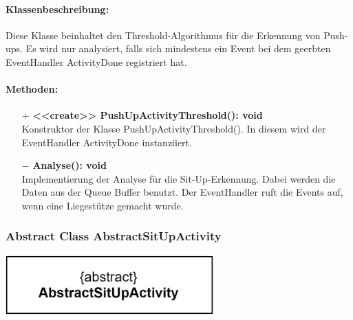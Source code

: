 \documentclass[a4paper,12pt]{article}
\begin{document}
	\paragraph{Klassenbeschreibung:}
	Diese Klasse beinhaltet den Threshold-Algorithmus für die Erkennung von Push-ups. Es wird nur analysiert, falls sich mindestens ein Event bei dem geerbten EventHandler ActivityDone registriert hat.
	\paragraph{Methoden:}
	\begin{itemize}
		\item [+]\textbf{<<create>> PushUpActivityThreshold(): void}\\Konstruktor der Klasse PushUpActivityThreshold(). In diesem wird der EventHandler ActivityDone instanziiert. 
		\item [$-$]\textbf{Analyse(): void}\\Implementierung der Analyse für die Sit-Up-Erkennung. Dabei werden die Daten aus der Queue Buffer benutzt. Der EventHandler ruft die Events auf, wenn eine Liegestütze gemacht wurde.\\
		\newline	
\end{itemize}

	\begin{minipage}[b]{0.6\textwidth}
		\subsubsection{Abstract Class AbstractSitUpActivity}
		\end{minipage}
		\begin{minipage}[c]{0.5\textwidth}
			\includegraphics[width=0.6\textwidth]{bilder/EMKlassen/AbstractSitUpActivityClass.png}
		\end{minipage}
		
\end{document}
